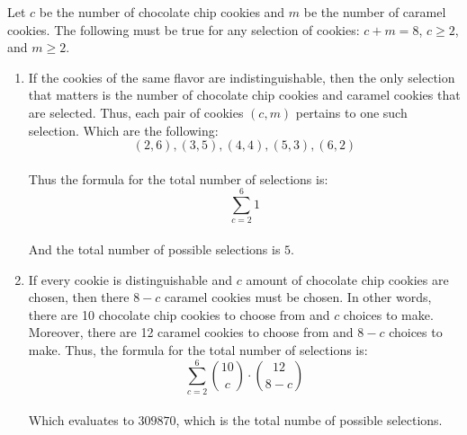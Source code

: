\documentclass[12pt]{article}
\begin{document}
  
\pagestyle{empty}
 




%
%
%







Let $c$ be the number of chocolate chip cookies and $m$ be the number of caramel cookies. The following must be true for any selection of cookies:
$c+m=8$, $c\geq 2$, and $m\geq 2$.\\
\begin{enumerate}
\item
If the cookies of the same flavor are indistinguishable, then the only selection that matters is the number of chocolate chip cookies and caramel cookies 
that are selected. Thus, each pair of cookies $(c,m)$ pertains to one such selection. Which are the following:\\
$$(2,6), (3,5), (4,4), (5,3), (6,2)$$\\
Thus the formula for the total number of selections is:\\
$$\sum\limits_{c=2}^{6} 1 $$\\
And the total number of possible selections is $5$.\\
\item
If every cookie is distinguishable and $c$ amount of chocolate chip cookies are chosen, then there $8-c$ caramel cookies must be chosen. In other words, 
there are 10 chocolate chip cookies to choose from and $c$ choices to make. Moreover, there are 12 caramel cookies to choose from and $8-c$ choices to make. 
Thus, the formula for the total number of selections is:\\
$$\sum\limits_{c=2}^{6} \binom{10}{c} \cdot \binom{12}{8-c}$$\\
Which evaluates to $309870$, which is the total numbe of possible selections.\\



\end{enumerate} 
\end{document}
